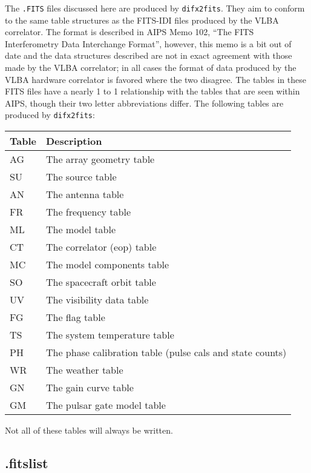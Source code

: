 The {\tt .FITS} files discussed here are produced by {\tt difx2fits}.
They aim to conform to the same table structures as the FITS-IDI files produced by the VLBA correlator.
The format is described in AIPS Memo 102, ``The FITS Interferometry Data Interchange Format'', however, this memo is a bit out of date and the data structures described are not in exact agreement with those made by the VLBA correlator; in all cases the format of data produced by the VLBA hardware correlator is favored where the two disagree.
The tables in these FITS files have a nearly 1 to 1 relationship with the tables that are seen within AIPS, though their two letter abbreviations differ.
The following tables are produced by {\tt difx2fits}:
\begin{center}
\begin{tabular}{l l}
\hline
Table & Description \\
\hline
AG & The array geometry table \\
SU & The source table \\
AN & The antenna table \\
FR & The frequency table \\
ML & The model table \\
CT & The correlator (eop) table \\
MC & The model components table \\
SO & The spacecraft orbit table \\
UV & The visibility data table \\
FG & The flag table \\
TS & The system temperature table \\
PH & The phase calibration table (pulse cals and state counts) \\
WR & The weather table \\
GN & The gain curve table \\
GM & The pulsar gate model table \\
\hline
\end{tabular}
\end{center}
Not all of these tables will always be written.








\subsection{.fitslist} \label{sec:fitslist}

